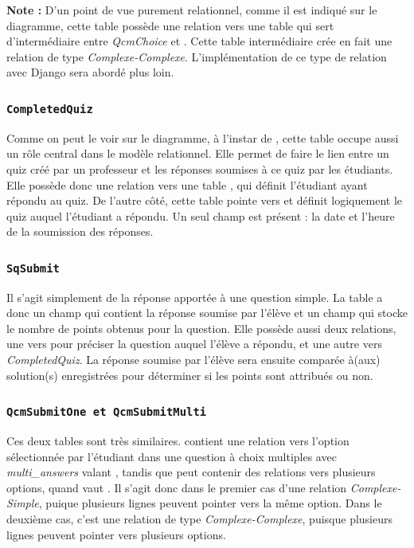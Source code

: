 \documentclass[a4,10pt,french]{sphinxmanual}
\begin{document}
\textbf{Note :} D'un point de vue purement relationnel, comme il est indiqué sur le diagramme, cette table possède une relation vers une table qui sert d'intermédiaire entre \emph{QcmChoice} et . Cette table intermédiaire crée en fait une relation de type \emph{Complexe-Complexe}. L'implémentation de ce type de relation avec Django sera abordé plus loin.


\subsubsection{\texttt{CompletedQuiz}}
\label{database:completedquiz}
Comme on peut le voir sur le diagramme, à l'instar de , cette table occupe aussi un rôle central dans le modèle relationnel. Elle permet de faire le lien entre un quiz créé par un professeur et les réponses soumises à ce quiz par les étudiants. Elle possède donc une relation vers une table , qui définit l'étudiant ayant répondu au quiz. De l'autre côté, cette table pointe vers  et définit logiquement le quiz auquel l'étudiant a répondu. Un seul champ est présent : la date et l'heure de la soumission des réponses.


\subsubsection{\texttt{SqSubmit}}
\label{database:sqsubmit}
Il s'agit simplement de la réponse apportée à une question simple. La table a donc un champ  qui contient la réponse soumise par l'élève et un champ  qui stocke le nombre de points obtenus pour la question. Elle possède aussi deux relations, une vers  pour préciser la question auquel l'élève a répondu, et une autre vers \emph{CompletedQuiz}. La réponse soumise par l'élève sera ensuite comparée à(aux) solution(s) enregistrées pour déterminer si les points sont attribués ou non.


\subsubsection{\texttt{QcmSubmitOne et QcmSubmitMulti}}
\label{database:qcmsubmitone-et-qcmsubmitmulti}
Ces deux tables sont très similaires.  contient une relation vers l'option sélectionnée par l'étudiant dans une question à choix multiples avec \emph{multi\_answers} valant , tandis que  peut contenir des relations vers plusieurs options, quand  vaut . Il s'agit donc dans le premier cas d'une relation \emph{Complexe-Simple}, puique plusieurs lignes peuvent pointer vers la même option. Dans le deuxième cas, c'est une relation de type \emph{Complexe-Complexe}, puisque plusieurs lignes peuvent pointer vers plusieurs options.
\end{document}
